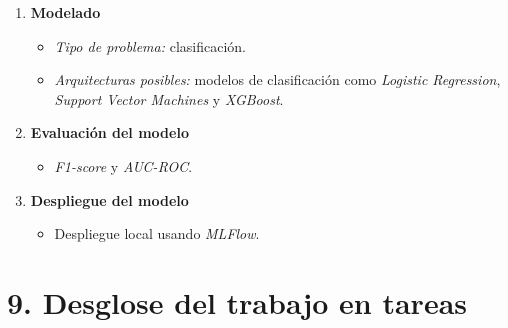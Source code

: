 \documentclass[
11pt, %
]{charter}
\begin{document}
\begin{enumerate}
\begin{itemize}
\begin{itemize}
            \end{itemize}
    \end{itemize}
  \item \textbf{Modelado}
    \begin{itemize}
        \item \textit{Tipo de problema:} clasificación.
        \item \textit{Arquitecturas posibles:} modelos de clasificación como \textit{Logistic Regression}, \textit{Support Vector Machines} y \textit{XGBoost}.
    \end{itemize}
  \item \textbf{Evaluación del modelo}
    \begin{itemize}
        \item \textit{F1-score} y \textit{AUC-ROC}.
    \end{itemize}
  \item \textbf{Despliegue del modelo}
    \begin{itemize}
        \item Despliegue local usando \textit{MLFlow}.
    \end{itemize}
\end{enumerate}

\section{9. Desglose del trabajo en tareas}
\label{sec:wbs}
\end{document}
